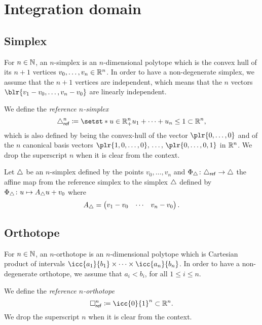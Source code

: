 
\section{Integration domain}

\subsection{Simplex}

For \( n  \in \mathbb{N} \), an \( n \)-simplex is an \( n \)-dimensional polytope which is the convex hull of its \( n+1 \) vertices \( v_0, \ldots, v_n \in \mathbb{R}^n \).
In order to have a non-degenerate simplex, we assume that the \( n+1 \) vertices are independent, which means that the \( n \) vectors \( \blr{v_1 - v_0, \ldots, v_n - v_0} \) are linearly independent.

\begin{definition}
    We define the \emph{reference \( n \)-simplex}
    \[
        \Simplex_\Rf^n \coloneqq \setst*{u \in \bbR_+^n}{u_1 + \cdots + u_n \leq 1} \subset \bbR^n,
    \]
    which is also defined by being the convex-hull of the vector \( \plr{0, \ldots, 0} \) and of the \( n \) canonical basis vectors \( \plr{1, 0, \ldots, 0},\, \ldots,\, \plr{0, \ldots, 0, 1} \) in \( \mathbb{R}^n \).
    We drop the superscript \( n \) when it is clear from the context.
\end{definition}

Let \( \triangle \) be an \( n \)-simplex defined by the points \( v_0, \ldots, v_n \) and \( \Phi_\triangle \colon \triangle_{\mathsf{ref}} \to \triangle \) the affine map from the reference simplex to the simplex \( \triangle \) defined by \( \Phi_\triangle \colon u \mapsto A_\triangle u + v_0 \) where
\[
    A_\triangle = \begin{pmatrix}
        v_1 - v_0 & \cdots & v_n - v_0
    \end{pmatrix}.
\]

\subsection{Orthotope}

For \( n  \in \mathbb{N} \), an \( n \)-orthotope is an \( n \)-dimensional polytope which is Cartesian product of intervals \( \icc{a_1}{b_1} \times \cdots \times \icc{a_n}{b_n} \).
In order to have a non-degenerate orthotope, we assume that \( a_i < b_i \), for all \( 1 \leq i \leq n \).

\begin{definition}
    We define the \emph{reference \( n \)-orthotope}
    \[
        \Orthotope_\Rf^n \coloneqq \icc{0}{1}^n \subset \bbR^n.
    \]
    We drop the superscript \( n \) when it is clear from the context.
\end{definition}
